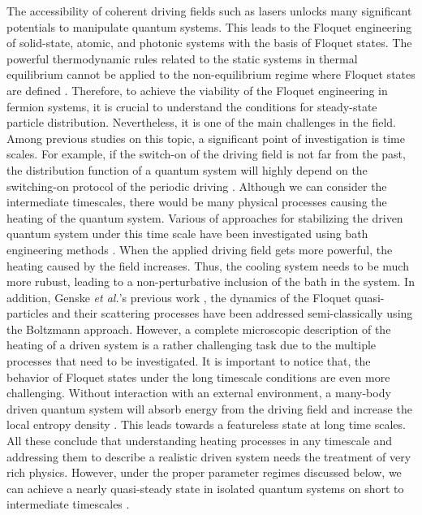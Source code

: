 \documentclass{article}
\begin{document}
The accessibility of coherent driving fields such as lasers unlocks many significant potentials to manipulate quantum systems. This leads to the Floquet engineering of solid-state, atomic, and photonic systems with the basis of Floquet states. The powerful thermodynamic rules related to the static systems in thermal equilibrium cannot be applied to the non-equilibrium regime where Floquet states are defined \cite{seetharam2015}. Therefore, to achieve the viability of the Floquet engineering in fermion systems, it is crucial to understand the conditions for steady-state particle distribution. Nevertheless, it is one of the main challenges in the field. Among previous studies on this topic, a significant point of investigation is time scales. For example, if the switch-on of the driving field is not far from the past, the distribution function of a quantum system will highly depend on the switching-on protocol of the periodic driving \cite{dehghani2014}. Although we can consider the intermediate timescales, there would be many physical processes causing the heating of the quantum system. Various of approaches for stabilizing the driven quantum system under this time scale have been investigated using bath engineering methods \cite{seetharam2015,weidinger2017,seetharam2019,rudner2020}. When the applied driving field gets more powerful, the heating caused by the field increases. Thus, the cooling system needs to be much more rubust, leading to a non-perturbative inclusion of the bath in the system. In addition, Genske \textit{et al.}'s previous work \cite{genske2015}, the dynamics of the Floquet quasi-particles and their scattering processes have been addressed semi-classically using the Boltzmann approach.
However, a complete microscopic description of the heating of a driven system is a rather challenging task due to the multiple processes that need to be investigated.
It is important to notice that, the behavior of Floquet states under the long timescale conditions are even more challenging.
Without interaction with an external environment, a many-body driven quantum system will absorb energy from the driving field and increase the local entropy density \cite{rudner2020}. This leads towards a featureless state at long time scales. All these conclude that understanding heating processes in any timescale and addressing them to describe a realistic driven system needs the treatment of very rich physics. However, under the proper parameter regimes discussed below, we can achieve a nearly quasi-steady state in isolated quantum systems on short to intermediate timescales \cite{lindner2017,bukov2015,eckardt2015,kuwahara2016,abanin2017,mori2018,rudner2020}.
\end{document}
